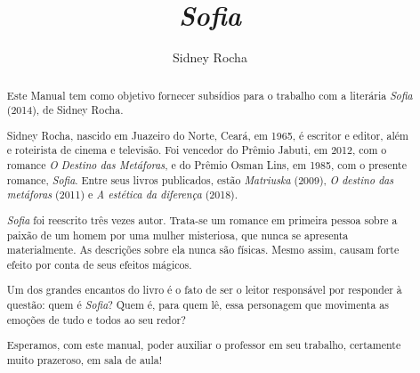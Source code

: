 \documentclass[12pt]{extarticle}
\begin{document}
\newcommand{\AutorLivro}{Sidney Rocha}
\newcommand{\TituloLivro}{\textit{Sofia}}
\newcommand{\Tema}{Ficção, mistério e fantasia}
\newcommand{\Genero}{Romance}
\newcommand{\imagemCapa}{./images/PNLD0054-01.png}
\newcommand{\issnppub}{---}
\newcommand{\issnepub}{---}
\newcommand{\colaborador}{\textbf{Fulano de Tal} é uma pessoa incrível e vai
fazer um bom serviço.}


\title{\TituloLivro} \author{\AutorLivro} \def\authornotes{\colaborador}

\date{} \maketitle

\baselineskip\par

\begin{abstract}

Este Manual tem como objetivo fornecer subsídios para o trabalho com a
  literária \textit{Sofia} (2014), de Sidney Rocha.

Sidney Rocha, nascido em Juazeiro do Norte, Ceará, em 1965, é escritor e
  editor, além e roteirista de cinema e televisão. 
  Foi vencedor do Prêmio Jabuti, em
  2012, com o romance \textit{O Destino das Metáforas}, e do Prêmio Osman Lins,
  em 1985, com o presente romance, \textit{Sofia}. Entre 
  seus livros publicados, estão 
  \textit{Matriuska} (2009), 
  \textit{O destino das metáforas} (2011) e
  \textit{A estética da diferença} (2018).


\textit{Sofia} foi reescrito três vezes autor. Trata-se um romance
  em primeira pessoa sobre a paixão de um homem por uma mulher misteriosa, 
  que nunca se apresenta materialmente. As descrições sobre ela nunca são físicas.
  Mesmo assim, causam forte efeito por conta de seus efeitos mágicos. 

Um dos grandes encantos do livro é o fato de ser o
  leitor responsável por responder à questão: quem é \textit{Sofia}? Quem é, para quem
  lê, essa personagem que movimenta as emoções de tudo e todos ao seu redor?



Esperamos, com este manual, poder auxiliar o professor em seu trabalho,
  certamente muito prazeroso, em sala de aula!


\end{abstract}

\tableofcontents
\end{document}

